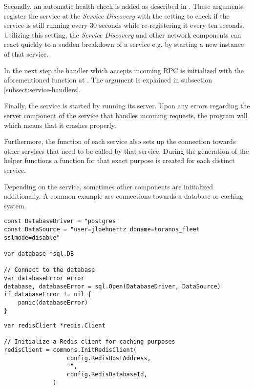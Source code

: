 \documentclass[12pt,a4paper,twoside]{report}
\begin{document}
Secondly, an automatic health check is added as described in
. These arguments register the service
at the \textit{Service Discovery} with the setting to check if the service is
still running every 30 seconds while re-registering it every ten seconds.
Utilizing this setting, the \textit{Service Discovery} and other
network components can react quickly to a sudden breakdown of a service e.g.
by starting a new instance of that service.

In the next step the handler which accepts incoming RPC is initialized with the
aforementioned function at .
The argument  is explained in subsection \ref{subsect:service-handlers}.

Finally, the service is started by running its server. Upon any errors regarding
the server component of the service that handles incoming requests,
the program will  which means that it crashes properly.

Furthermore, the  function of each service also sets up
the connection towards other services that need to be called by that service.
During the generation of the helper functions a function for that exact purpose
is created for each distinct service.

Depending on the service, sometimes other components are initialized additionally.
A common example are connections towards a database or caching system.

\begin{lstlisting}[title=services/fleet-controller/main.go]
const DatabaseDriver = "postgres"
const DataSource = "user=jloehnertz dbname=toranos_fleet sslmode=disable"

var database *sql.DB

// Connect to the database
var databaseError error
database, databaseError = sql.Open(DatabaseDriver, DataSource)
if databaseError != nil {
	panic(databaseError)
}
\end{lstlisting}

\begin{lstlisting}[title=services/fleet-monitor/main.go]
var redisClient *redis.Client

// Initialize a Redis client for caching purposes
redisClient = commons.InitRedisClient(
                  config.RedisHostAddress,
                  "",
                  config.RedisDatabaseId,
              )
\end{lstlisting}
\end{document}

